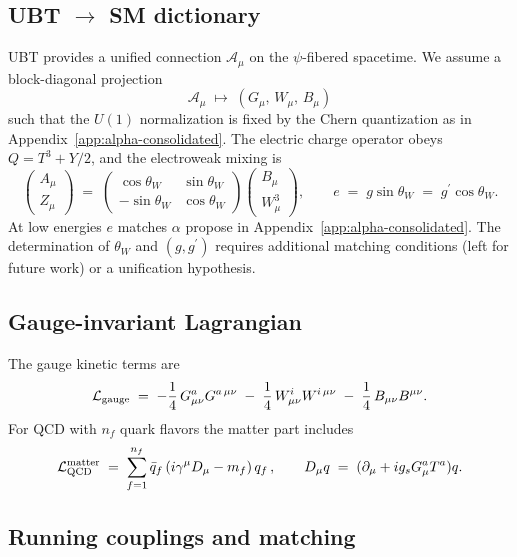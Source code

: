 \subsection{UBT $\to$ SM dictionary}
UBT provides a unified connection $\mathcal{A}_\mu$ on the $\psi$-fibered spacetime. We assume a block-diagonal projection
\begin{equation}
\mathcal{A}_\mu \;\longmapsto\; (G_\mu,\, W_\mu,\, B_\mu)
\end{equation}
such that the $U(1)$ normalization is fixed by the Chern quantization as in Appendix~\ref{app:alpha-consolidated}.
The electric charge operator obeys $Q = T^3 + Y/2$, and the electroweak mixing is
\begin{equation}
\begin{pmatrix} A_\mu \\ Z_\mu \end{pmatrix} \;=\;
\begin{pmatrix} \cos\theta_W & \sin\theta_W \\ -\sin\theta_W & \cos\theta_W \end{pmatrix}
\begin{pmatrix} B_\mu \\ W^3_\mu \end{pmatrix},
\qquad
e \;=\; g \sin\theta_W \;=\; g^\prime \cos\theta_W.
\end{equation}
At low energies $e$ matches $\alpha$ propose in Appendix~\ref{app:alpha-consolidated}. The determination of $\theta_W$ and $(g,g^\prime)$
requires additional matching conditions (left for future work) or a unification hypothesis.

\subsection{Gauge-invariant Lagrangian}
The gauge kinetic terms are
\begin{equation}
\mathcal{L}_{\rm gauge} \;=\; -\frac{1}{4}\,G_{\mu\nu}^a G^{a\,\mu\nu} \;-\; \frac{1}{4}\,W_{\mu\nu}^i W^{i\,\mu\nu} \;-\; \frac{1}{4}\,B_{\mu\nu} B^{\mu\nu}.
\end{equation}
For QCD with $n_f$ quark flavors the matter part includes
\begin{equation}
\mathcal{L}_{\rm QCD}^{\rm matter} \;=\; \sum_{f=1}^{n_f} \bar{q}_f\,(i\gamma^\mu D_\mu - m_f)\,q_f\,,
\qquad D_\mu q \;=\; (\partial_\mu + i g_s G_\mu^a T^a)q.
\end{equation}

\subsection{Running couplings and matching}
